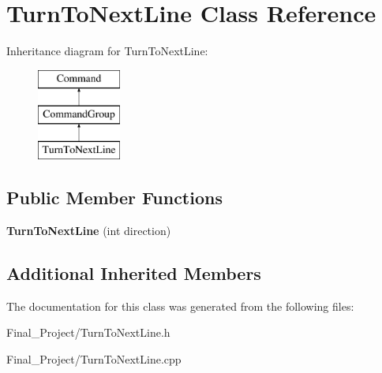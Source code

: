 \hypertarget{classTurnToNextLine}{\section{Turn\-To\-Next\-Line Class Reference}
\label{classTurnToNextLine}
}
Inheritance diagram for Turn\-To\-Next\-Line\-:\begin{figure}[H]
\begin{center}
\leavevmode
\includegraphics[height=3.000000cm]{classTurnToNextLine}
\end{center}
\end{figure}
\subsection*{Public Member Functions}
\begin{DoxyCompactItemize}
\item 
\hypertarget{classTurnToNextLine_adf08caa64eb869d5aad0d49f4f491e84}{{\bfseries Turn\-To\-Next\-Line} (int direction)}\label{classTurnToNextLine_adf08caa64eb869d5aad0d49f4f491e84}

\end{DoxyCompactItemize}
\subsection*{Additional Inherited Members}


The documentation for this class was generated from the following files\-:\begin{DoxyCompactItemize}
\item 
Final\-\_\-\-Project/Turn\-To\-Next\-Line.\-h\item 
Final\-\_\-\-Project/Turn\-To\-Next\-Line.\-cpp\end{DoxyCompactItemize}
